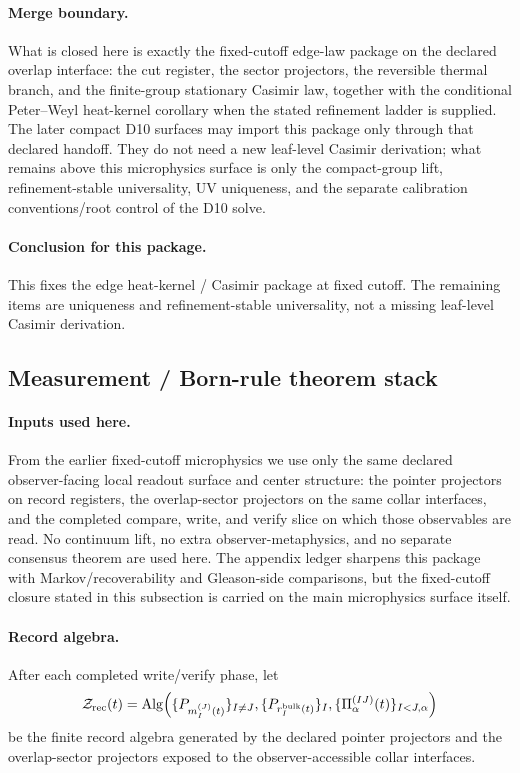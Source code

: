 \documentclass[11pt]{article}
\begin{document}
\paragraph{Merge boundary.}
What is closed here is exactly the fixed-cutoff edge-law package on the declared overlap
interface: the cut register, the sector projectors, the reversible thermal branch, and the
finite-group stationary Casimir law, together with the conditional Peter--Weyl heat-kernel
corollary when the stated refinement ladder is supplied. The later compact D10 surfaces may
import this package only through that declared handoff. They do not need a new leaf-level
Casimir derivation; what remains above this microphysics surface is only the compact-group lift,
refinement-stable universality, UV uniqueness, and the separate calibration conventions/root
control of the D10 solve.

\paragraph{Conclusion for this package.}
This fixes the edge heat-kernel / Casimir package at fixed cutoff. The remaining items are uniqueness and refinement-stable universality, not a missing leaf-level Casimir derivation.

\subsection{Measurement / Born-rule theorem stack}

\paragraph{Inputs used here.}
From the earlier fixed-cutoff microphysics we use only the same declared observer-facing local
readout surface and center structure: the pointer projectors on record registers, the
overlap-sector projectors on the same collar interfaces, and the completed compare, write, and
verify slice on which those observables are read. No continuum lift, no extra
observer-metaphysics, and no separate consensus theorem are used here. The appendix ledger
sharpens this package with Markov/recoverability and Gleason-side comparisons, but the
fixed-cutoff closure stated in this subsection is carried on the main microphysics
surface itself.

\paragraph{Record algebra.}
After each completed write/verify phase, let
\begin{equation}
\mathcal Z_{\mathrm{rec}}(t)
=
\mathrm{Alg}\Bigl(
\{P_{m_I^{(J)}(t)}\}_{I\neq J},
\{P_{r_I^{\mathrm{bulk}}(t)}\}_I,
\{\Pi_\alpha^{(IJ)}(t)\}_{I<J,\alpha}
\Bigr)
\end{equation}
be the finite record algebra generated by the declared pointer projectors and the overlap-sector
projectors exposed to the observer-accessible collar interfaces.
\end{document}
